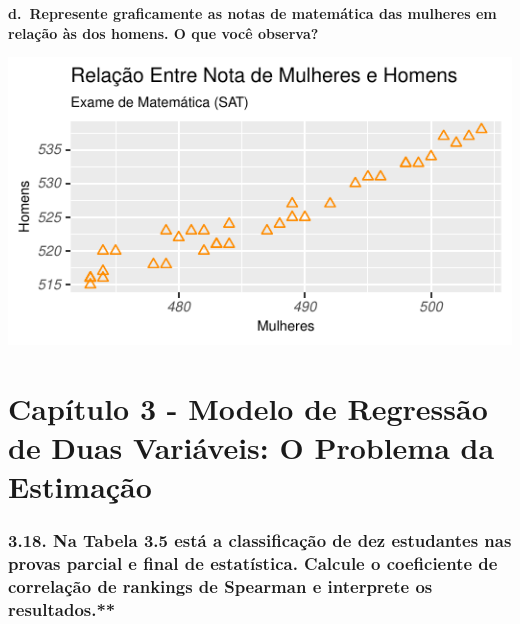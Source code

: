 \documentclass[
  11pt,
  a4paper,
]{article}
\begin{document}
\textbf{d.~Represente graficamente as notas de matemática das mulheres em relação às dos homens. O que você observa?}

\begin{center}\includegraphics{article_files/figure-latex/unnamed-chunk-20-1} \end{center}

\newpage

\hypertarget{capuxedtulo-3---modelo-de-regressuxe3o-de-duas-variuxe1veis-o-problema-da-estimauxe7uxe3o}{%
\section{Capítulo 3 - Modelo de Regressão de Duas Variáveis: O Problema da Estimação}\label{capuxedtulo-3---modelo-de-regressuxe3o-de-duas-variuxe1veis-o-problema-da-estimauxe7uxe3o}}

\hypertarget{na-tabela-3.5-estuxe1-a-classificauxe7uxe3o-de-dez-estudantes-nas-provas-parcial-e-final-de-estatuxedstica.-calcule-o-coeficiente-de-correlauxe7uxe3o-de-rankings-de-spearman-e-interprete-os-resultados.}{%
\subsubsection{3.18. Na Tabela 3.5 está a classificação de dez estudantes nas provas parcial e final de estatística. Calcule o coeficiente de correlação de rankings de Spearman e interprete os resultados.**}\label{na-tabela-3.5-estuxe1-a-classificauxe7uxe3o-de-dez-estudantes-nas-provas-parcial-e-final-de-estatuxedstica.-calcule-o-coeficiente-de-correlauxe7uxe3o-de-rankings-de-spearman-e-interprete-os-resultados.}}
\end{document}
